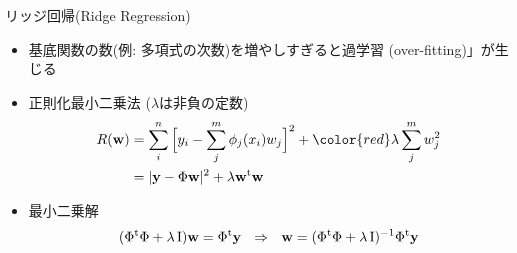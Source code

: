 \begin{frame}[t,fragile]{リッジ回帰(Ridge Regression)}
  \begin{itemize}
  \item 基底関数の数(例: 多項式の次数)を増やしすぎると過学習 (over-fitting)」が生じる
  \item 正則化最小二乗法 ($\lambda$は非負の定数)
    \begin{align*}
    R({\bf w}) &= \sum_i^n \Big[y_i - \sum_j^m \phi_j(x_i) w_j\Big]^2 + {\color{red} \lambda} \sum_j^m w_j^2 \\
    &= | {\bf y} - \Phi {\bf w} |^2 + \lambda {\bf w}^{\rm t} {\bf w}
    \end{align*}
  \item 最小二乗解
    \[
    (\Phi^{\rm t} \Phi + \lambda \, {\rm I}) {\bf w} = \Phi^{\rm t} {\bf y} \ \ \Rightarrow \ \ 
      {\bf w} = (\Phi^{\rm t} \Phi + \lambda \, {\rm I})^{-1}\Phi^{\rm t} {\bf y}
      \]
  \end{itemize}
\end{frame}
